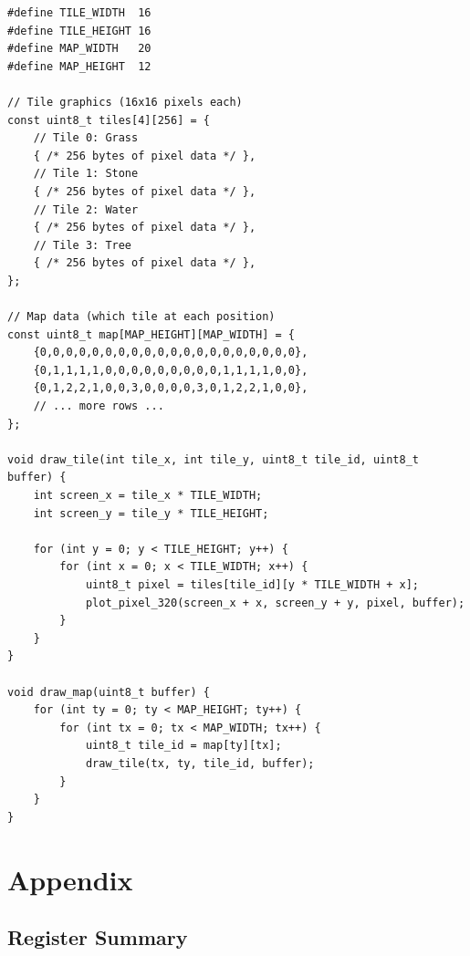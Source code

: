 \documentclass[11pt,letterpaper]{report}
\begin{document}
\begin{lstlisting}[style=c,caption={Tile-Based Background}]
#define TILE_WIDTH  16
#define TILE_HEIGHT 16
#define MAP_WIDTH   20
#define MAP_HEIGHT  12

// Tile graphics (16x16 pixels each)
const uint8_t tiles[4][256] = {
    // Tile 0: Grass
    { /* 256 bytes of pixel data */ },
    // Tile 1: Stone
    { /* 256 bytes of pixel data */ },
    // Tile 2: Water
    { /* 256 bytes of pixel data */ },
    // Tile 3: Tree
    { /* 256 bytes of pixel data */ },
};

// Map data (which tile at each position)
const uint8_t map[MAP_HEIGHT][MAP_WIDTH] = {
    {0,0,0,0,0,0,0,0,0,0,0,0,0,0,0,0,0,0,0,0},
    {0,1,1,1,1,0,0,0,0,0,0,0,0,0,1,1,1,1,0,0},
    {0,1,2,2,1,0,0,3,0,0,0,0,3,0,1,2,2,1,0,0},
    // ... more rows ...
};

void draw_tile(int tile_x, int tile_y, uint8_t tile_id, uint8_t buffer) {
    int screen_x = tile_x * TILE_WIDTH;
    int screen_y = tile_y * TILE_HEIGHT;
    
    for (int y = 0; y < TILE_HEIGHT; y++) {
        for (int x = 0; x < TILE_WIDTH; x++) {
            uint8_t pixel = tiles[tile_id][y * TILE_WIDTH + x];
            plot_pixel_320(screen_x + x, screen_y + y, pixel, buffer);
        }
    }
}

void draw_map(uint8_t buffer) {
    for (int ty = 0; ty < MAP_HEIGHT; ty++) {
        for (int tx = 0; tx < MAP_WIDTH; tx++) {
            uint8_t tile_id = map[ty][tx];
            draw_tile(tx, ty, tile_id, buffer);
        }
    }
}
\end{lstlisting}

\chapter{Appendix}

\section{Register Summary}
\end{document}
